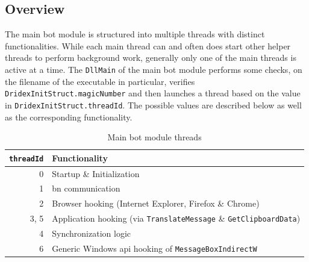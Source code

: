 \subsection{Overview\label{subsec:Reverse_engineering_Dridex::Bot_stage::Overview}}
The main \gls{bot} module is structured into multiple threads with distinct functionalities.
While each main thread can and often does start other helper threads to perform background work, generally only one of the main threads is active at a time.
The \lstinline|DllMain| of the main \gls{bot} module performs some checks, on the filename of the executable in particular, verifies \lstinline|DridexInitStruct.magicNumber| and then launches a thread based on the value in \lstinline|DridexInitStruct.threadId|.
The possible values are described below as well as the corresponding functionality.

\begin{table}[htb]
    \centering
    \begin{tabular}{rl}
        \toprule
        \lstinline|threadId| &
        Functionality\\
        \midrule

        0 &
        Startup \& Initialization\\

        1 &
        \Gls{bn} communication\\

        2 &
        Browser hooking (Internet Explorer, Firefox \& Chrome)\\



        3, 5 &
        Application hooking (via \lstinline|TranslateMessage| \& \lstinline|GetClipboardData|)\\

        4 &
        Synchronization logic\\

        6 &
        Generic Windows \gls{api} hooking of \lstinline|MessageBoxIndirectW|\\
        \bottomrule
    \end{tabular}
    \caption{Main \gls{bot} module threads\label{tab:Main_module::Threads}}
\end{table}

